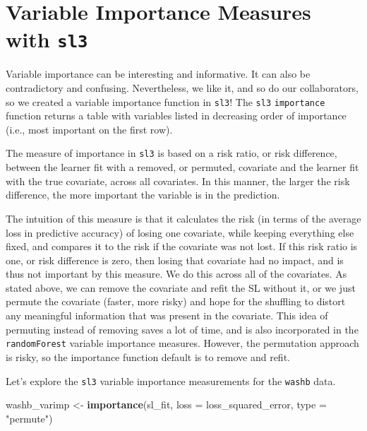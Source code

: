 \documentclass[12pt, krantz2,]{book}
\newenvironment{Shaded}{\begin{snugshade}}{\end{snugshade}}
\newcommand{\DataTypeTok}[1]{\textcolor[rgb]{0.13,0.29,0.53}{#1}}
\newcommand{\KeywordTok}[1]{\textcolor[rgb]{0.13,0.29,0.53}{\textbf{#1}}}
\newcommand{\NormalTok}[1]{#1}
\newcommand{\StringTok}[1]{\textcolor[rgb]{0.31,0.60,0.02}{#1}}
\theoremstyle{definition}
\theoremstyle{definition}
\theoremstyle{definition}
\newcommand{\1}{\mathbbm{1}}
\begin{document}
\hypertarget{variable-importance-measures-with-sl3}{%
\section*{\texorpdfstring{Variable Importance Measures with \texttt{sl3}}{Variable Importance Measures with sl3}}\label{variable-importance-measures-with-sl3}}


Variable importance can be interesting and informative. It can also be
contradictory and confusing. Nevertheless, we like it, and so do our
collaborators, so we created a variable importance function in \texttt{sl3}! The \texttt{sl3}
\texttt{importance} function returns a table with variables listed in decreasing order
of importance (i.e., most important on the first row).

The measure of importance in \texttt{sl3} is based on a risk ratio, or risk
difference, between the learner fit with a removed, or permuted, covariate and
the learner fit with the true covariate, across all covariates. In this manner,
the larger the risk difference, the more important the variable is in the
prediction.

The intuition of this measure is that it calculates the risk (in terms of the
average loss in predictive accuracy) of losing one covariate, while keeping
everything else fixed, and compares it to the risk if the covariate was not
lost. If this risk ratio is one, or risk difference is zero, then losing that
covariate had no impact, and is thus not important by this measure. We do this
across all of the covariates. As stated above, we can remove the covariate and
refit the SL without it, or we just permute the covariate (faster, more risky)
and hope for the shuffling to distort any meaningful information that was
present in the covariate. This idea of permuting instead of removing saves a
lot of time, and is also incorporated in the \texttt{randomForest} variable importance
measures. However, the permutation approach is risky, so the importance
function default is to remove and refit.

Let's explore the \texttt{sl3} variable importance measurements for the \texttt{washb} data.

\begin{Shaded}
\begin{Highlighting}[]
\NormalTok{washb_varimp <-}\StringTok{ }\KeywordTok{importance}\NormalTok{(sl_fit, }\DataTypeTok{loss =}\NormalTok{ loss_squared_error, }\DataTypeTok{type =} \StringTok{"permute"}\NormalTok{)}
\end{Highlighting}
\end{Shaded}
\end{document}
